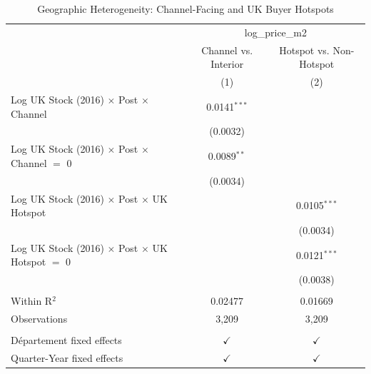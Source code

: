 
\begin{table}[htbp]
   \caption{\label{tab:geographic} Geographic Heterogeneity: Channel-Facing and UK Buyer Hotspots}
   \bigskip
   \centering
   \begin{tabular}{lcc}
      \toprule
       & \multicolumn{2}{c}{log\_price\_m2}\\
                                                                    & Channel vs. Interior & Hotspot vs. Non-Hotspot \\   
                                                                    & (1)                  & (2)\\  
      \midrule 
      Log UK Stock (2016) $\times$ Post $\times$ Channel            & 0.0141$^{***}$       &   \\   
                                                                    & (0.0032)             &   \\   
      Log UK Stock (2016) $\times$ Post $\times$ Channel $=$ 0      & 0.0089$^{**}$        &   \\   
                                                                    & (0.0034)             &   \\   
      Log UK Stock (2016) $\times$ Post $\times$ UK Hotspot         &                      & 0.0105$^{***}$\\   
                                                                    &                      & (0.0034)\\   
      Log UK Stock (2016) $\times$ Post $\times$ UK Hotspot $=$ 0   &                      & 0.0121$^{***}$\\   
                                                                    &                      & (0.0038)\\   
       \\
      Within R$^2$                                                  & 0.02477              & 0.01669\\  
      Observations                                                  & 3,209                & 3,209\\  
       \\
      D\'epartement fixed effects                                   & $\checkmark$         & $\checkmark$\\   
      Quarter-Year fixed effects                                    & $\checkmark$         & $\checkmark$\\   
      \bottomrule
   \end{tabular}
\end{table}


